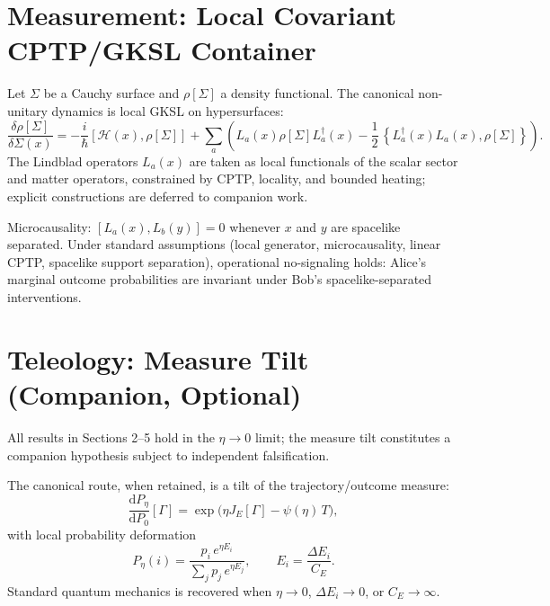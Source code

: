 \documentclass[reprint,amsmath,amssymb,aps,showkeys]{revtex4-2}
\newcommand{\dd}{\mathrm{d}}
\newcommand{\Comm}[2]{\left[#1,#2\right]}
\newcommand{\AComm}[2]{\left\{#1,#2\right\}}
\newcommand{\cH}{\mathcal{H}}
\begin{document}
\section{Measurement: Local Covariant CPTP/GKSL Container}
Let $\Sigma$ be a Cauchy surface and $\rho[\Sigma]$ a density functional. The canonical non-unitary dynamics is local GKSL on hypersurfaces:
\begin{equation}
\frac{\delta \rho[\Sigma]}{\delta \Sigma(x)}
=
-\frac{i}{\hbar}\Comm{\cH(x)}{\rho[\Sigma]}
+
\sum_a \left(
L_a(x)\rho[\Sigma]L_a^\dagger(x)
-\frac12\,\AComm{L_a^\dagger(x)L_a(x)}{\rho[\Sigma]}
\right).
\label{eq:TS_GKSL}
\end{equation}
The Lindblad operators $L_a(x)$ are taken as local functionals of the scalar sector and matter operators, constrained by CPTP, locality, and bounded heating; explicit constructions are deferred to companion work.

Microcausality: $\Comm{L_a(x)}{L_b(y)}=0$ whenever $x$ and $y$ are spacelike separated. Under standard assumptions (local generator, microcausality, linear CPTP, spacelike support separation), operational no-signaling holds: Alice's marginal outcome probabilities are invariant under Bob's spacelike-separated interventions.

\section{Teleology: Measure Tilt (Companion, Optional)}
All results in Sections 2--5 hold in the $\eta\to 0$ limit; the measure tilt constitutes a companion hypothesis subject to independent falsification.

The canonical route, when retained, is a tilt of the trajectory/outcome measure:
\begin{equation}
\frac{\dd P_\eta}{\dd P_0}[\Gamma]
=
\exp\!\Big(\eta J_E[\Gamma]-\psi(\eta)\,T\Big),
\end{equation}
with local probability deformation
\begin{equation}
P_\eta(i)=\frac{p_i\,e^{\eta E_i}}{\sum_j p_j\,e^{\eta E_j}},\qquad E_i=\frac{\Delta E_i}{C_E}.
\end{equation}
Standard quantum mechanics is recovered when $\eta\to 0$, $\Delta E_i\to 0$, or $C_E\to\infty$.
\end{document}
